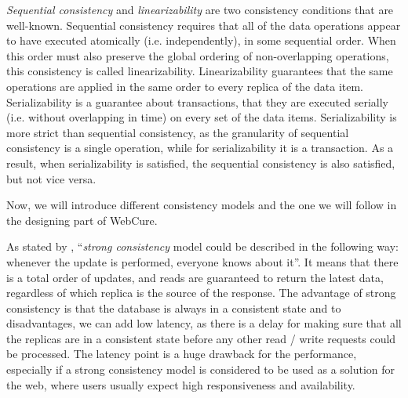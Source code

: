 \textit{Sequential consistency} and \textit{linearizability} are two consistency conditions that are well-known. Sequential consistency requires that all of the data operations appear to have executed atomically (i.e. independently), in some sequential order. When this order must also preserve the global ordering of non-overlapping operations, this consistency is called linearizability\cite{27}. Linearizability guarantees that the same operations are applied in the same order to every replica of the data item\cite{12}. Serializability is a guarantee about transactions, that they are executed serially (i.e. without overlapping in time) on every set of the data items\cite{12}. Serializability is more strict than sequential consistency, as the granularity of sequential consistency is a single operation, while for serializability it is a transaction. As a result, when serializability is satisfied, the sequential consistency is also satisfied, but not vice versa.

Now, we will introduce different consistency models and the one we will follow in the designing part of WebCure. 

As stated by \citet{10}, ``\textit{strong consistency} model could be described in the following way: whenever the update is performed, everyone knows about it''. It means that there is a total order of updates, and reads are guaranteed to return the latest data, regardless of which replica is the source of the response. The advantage of strong consistency is that the database is always in a consistent state and to disadvantages, we can add low latency, as there is a delay for making sure that all the replicas are in a consistent state before any other read / write requests could be processed. The latency point is a huge drawback for the performance, especially if a strong consistency model is considered to be used as a solution for the web, where users usually expect high responsiveness and availability. 

